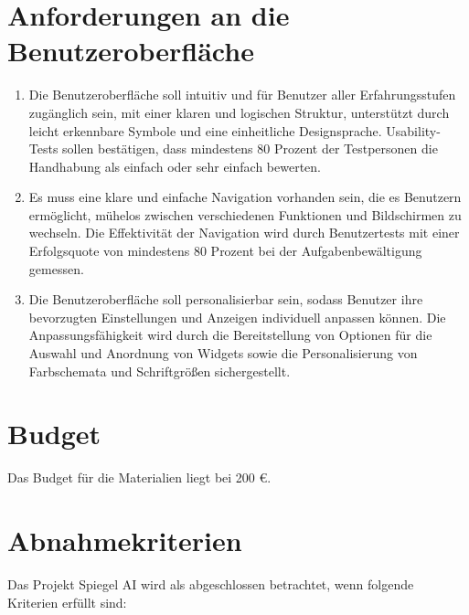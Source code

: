 \documentclass{article}
\begin{document}
\section{Anforderungen an die Benutzeroberfläche}
\begin{enumerate}[label=\textbf{B\arabic*:}]
    \item Die Benutzeroberfläche soll intuitiv und für Benutzer aller Erfahrungsstufen zugänglich sein, mit einer klaren und logischen Struktur, unterstützt durch leicht erkennbare Symbole und eine einheitliche Designsprache. Usability-Tests sollen bestätigen, dass mindestens 80 Prozent der Testpersonen die Handhabung als einfach oder sehr einfach bewerten.
    \item Es muss eine klare und einfache Navigation vorhanden sein, die es Benutzern ermöglicht, mühelos zwischen verschiedenen Funktionen und Bildschirmen zu wechseln. Die Effektivität der Navigation wird durch Benutzertests mit einer Erfolgsquote von mindestens 80 Prozent bei der Aufgabenbewältigung gemessen.
    \item Die Benutzeroberfläche soll personalisierbar sein, sodass Benutzer ihre bevorzugten Einstellungen und Anzeigen individuell anpassen können. Die Anpassungsfähigkeit wird durch die Bereitstellung von Optionen für die Auswahl und Anordnung von Widgets sowie die Personalisierung von Farbschemata und Schriftgrößen sichergestellt.
\end{enumerate}

\section{Budget}
Das Budget für die Materialien liegt bei 200 €.

\section{Abnahmekriterien}
Das Projekt Spiegel AI wird als abgeschlossen betrachtet, wenn folgende Kriterien erfüllt sind:
\end{document}
